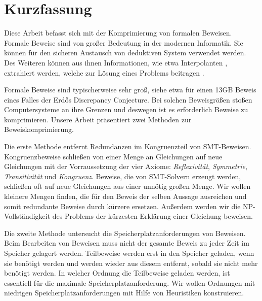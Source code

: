 \chapter*{Kurzfassung}

Diese Arbeit befasst sich mit der Komprimierung von formalen Beweisen.
Formale Beweise sind von gro{\ss}er Bedeutung in der modernen Informatik.
Sie k\"onnen f\"ur den sicheren Austausch von deduktiven System verwendet werden.
Des Weiteren k\"onnen aus ihnen Informationen, wie etwa Interpolanten \cite{McMill2005}, extrahiert werden, welche zur L\"osung eines Problems beitragen \cite{Hofferek2013}.

Formale Beweise sind typischerweise sehr gro{\ss}, siehe etwa \cite{Konev2014} f\"ur einen 13GB Beweis eines Falles der Erd\H{o}s Discrepancy Conjecture.
Bei solchen Beweisgr\"o{\ss}en sto{\ss}en Computersysteme an ihre Grenzen und deswegen ist es erforderlich Beweise zu komprimieren.
Unsere Arbeit pr\"asentiert zwei Methoden zur Beweiskomprimierung.

Die erste Methode entfernt Redundanzen im Kongruenzteil von SMT-Beweisen.
Kongruenzbeweise schlie{\ss}en von einer Menge an Gleichungen auf neue Gleichungen mit der Vorraussetzung der vier Axiome: \emph{Reflexivit\"at}, \emph{Symmetrie}, \emph{Transitivit\"at} und \emph{Kongruenz}.
Beweise, die von SMT-Solvern erzeugt werden, schlie{\ss}en oft auf neue Gleichungen aus einer unn\"otig gro{\ss}en Menge.
Wir wollen kleinere Mengen finden, die f\"ur den Beweis der selben Aussage ausreichen und somit redundante Beweise durch k\"urzere ersetzen.
Au{\ss}erdem werden wir die NP-Vollst\"andigkeit des Problems der k\"urzesten Erkl\"arung einer Gleichung beweisen.

Die zweite Methode untersucht die Speicherplatzanforderungen von Beweisen.
Beim Bearbeiten von Beweisen muss nicht der gesamte Beweis zu jeder Zeit im Speicher gelagert werden.
Teilbeweise werden erst in den Speicher geladen, wenn sie ben\"otigt werden und werden wieder aus diesem entfernt, sobald sie nicht mehr ben\"otigt werden.
In welcher Ordnung die Teilbeweise geladen werden, ist essentiell f\"ur die maximale Speicherplatzanforderung.
Wir wollen Ordnungen mit niedrigen Speicherplatzanforderungen mit Hilfe von Heuristiken konstruieren.